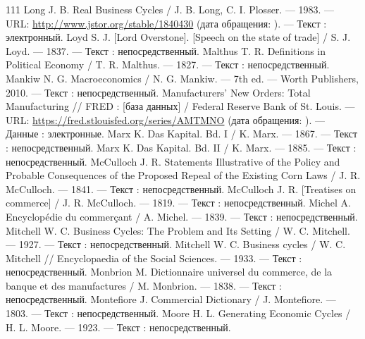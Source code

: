 \begin{RaggedRight}
\begin{thebibliography}{111}
     \hypertarget{bib:Long-1983}{} Long J. B. Real Business Cycles / J. B. Long, C. I. Plosser. --- 1983. --- URL: \url{http://www.jstor.org/stable/1840430} (дата обращения: \bibaccessdate). --- Текст : электронный.
     \hypertarget{bib:Loyd-1837}{} Loyd S. J. [Lord Overstone]. [Speech on the state of trade] / S. J. Loyd. --- 1837. --- Текст : непосредственный.
     \hypertarget{bib:Malthus-1827}{} Malthus T. R. Definitions in Political Economy / T. R. Malthus. --- 1827. --- Текст : непосредственный.
     \hypertarget{bib:Mankiw-2010}{} Mankiw N. G. Macroeconomics / N. G. Mankiw. --- 7th ed. --- Worth Publishers, 2010. --- Текст : непосредственный.
     \hypertarget{bib:FRED-AMTMNO}{} Manufacturers’ New Orders: Total Manufacturing // FRED : [база данных] / Federal Reserve Bank of St. Louis. --- URL: \url{https://fred.stlouisfed.org/series/AMTMNO} (дата обращения: \bibaccessdate). --- Данные : электронные.
     \hypertarget{bib:Marx-1867}{} Marx K. Das Kapital. Bd. I / K. Marx. --- 1867. --- Текст : непосредственный.
     \hypertarget{bib:Marx-1885}{} Marx K. Das Kapital. Bd. II / K. Marx. --- 1885. --- Текст : непосредственный.
     \hypertarget{bib:McCulloch-1841}{} McCulloch J. R. Statements Illustrative of the Policy and Probable Consequences of the Proposed Repeal of the Existing Corn Laws / J. R. McCulloch. --- 1841. --- Текст : непосредственный.
     \hypertarget{bib:McCulloch-1819}{} McCulloch J. R. [Treatises on commerce] / J. R. McCulloch. --- 1819. --- Текст : непосредственный.
     \hypertarget{bib:Michel-1839}{} Michel A. Encyclopédie du commerçant / A. Michel. --- 1839. --- Текст : непосредственный.
     \hypertarget{bib:Mitchell-1927}{} Mitchell W. C. Business Cycles: The Problem and Its Setting / W. C. Mitchell. --- 1927. --- Текст : непосредственный.
     \hypertarget{bib:Mitchell-1933}{} Mitchell W. C. Business cycles / W. C. Mitchell // Encyclopaedia of the Social Sciences. --- 1933. --- Текст : непосредственный.
     \hypertarget{bib:Monbrion-1838}{} Monbrion M. Dictionnaire universel du commerce, de la banque et des manufactures / M. Monbrion. --- 1838. --- Текст : непосредственный.
     \hypertarget{bib:Montefiore-1803}{} Montefiore J. Commercial Dictionary / J. Montefiore. --- 1803. --- Текст : непосредственный.
     \hypertarget{bib:Moore-1923}{} Moore H. L. Generating Economic Cycles / H. L. Moore. --- 1923. --- Текст : непосредственный.

\end{thebibliography}
\end{RaggedRight}
